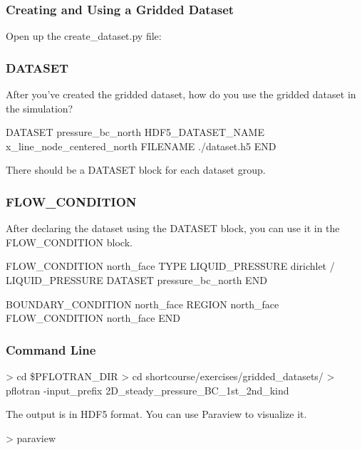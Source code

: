\documentclass{beamer}
\begin{document}
\begin{frame}\frametitle{Creating and Using a Gridded Dataset}

Open up the create\_dataset.py file:

\end{frame}

\begin{frame}\frametitle{DATASET}

After you've created the gridded dataset,
how do you use the gridded dataset in the simulation? 

\begin{semiverbatim}
DATASET pressure_bc_north
  HDF5_DATASET_NAME x_line_node_centered_north
  FILENAME ./dataset.h5
END
\end{semiverbatim}

There should be a DATASET block for each dataset group.

\end{frame}

\begin{frame}\frametitle{FLOW\_CONDITION}

After declaring the dataset using the DATASET block, you can use it in
the FLOW\_CONDITION block.

\begin{semiverbatim}
FLOW_CONDITION north_face
  TYPE
    LIQUID_PRESSURE dirichlet
  /
  LIQUID_PRESSURE DATASET pressure_bc_north
END

BOUNDARY_CONDITION north_face
  REGION north_face
  FLOW_CONDITION north_face
END
\end{semiverbatim}

\end{frame}

\begin{frame}[fragile]\frametitle{Command Line}

\begin{semiverbatim}

 > cd \$PFLOTRAN_DIR
 > cd shortcourse/exercises/gridded_datasets/
 > pflotran -input_prefix 2D_steady_pressure_BC_1st_2nd_kind

\end{semiverbatim}

The output is in HDF5 format. You can use Paraview to visualize it.

\begin{semiverbatim}
> paraview
\end{semiverbatim}

\end{frame}
\end{document}
